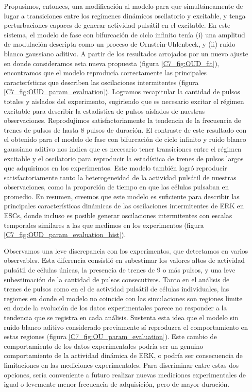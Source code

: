 \documentclass[./main.tex]{subfiles}
\begin{document}
Propusimos, entonces, una modificación al modelo para que simultáneamente de lugar a transiciones entre los regímenes dinámicos oscilatorio y excitable, y tenga perturbaciones capaces de generar actividad pulsátil en el excitable. En este sistema, el modelo de fase con bifurcación de ciclo infinito tenía (i) una amplitud de modulación descripta como un proceso de Ornstein-Uhlenbeck, y (ii) ruido blanco gaussiano aditivo.  A partir de los resultados arrojados por un nuevo ajuste en donde consideramos esta nueva propuesta (figura \ref{C7_fig:OUD_fit}), encontramos que el modelo reproducía correctamente las principales características que describen las oscilaciones intermitentes (figura \ref{C7_fig:OUD_param_evaluation}). Logramos recapitular la cantidad de pulsos totales y aislados del experimento, sugiriendo que es necesario excitar el régimen excitable para describir la estadística de pulsos aislados de nuestras observaciones. Reprodujimos satisfactoriamente la tendencia de la frecuencia de trenes de pulsos de hasta 8 pulsos de duración. El contraste de este resultado con el obtenido para el modelo de fase con bifurcación de ciclo infinito y ruido blanco gaussiano aditivo nos indica que es necesario tener transiciones entre el régimen excitable y el oscilatorio para reproducir la estadística de trenes de pulsos largos que adquirimos en los experimentos. Este modelo también logró reproducir satisfactoriamente tanto la heterogeneidad de la actividad pulsátil de nuestras observaciones, como la proporción de tiempo en que las células pulsaban en promedio. En resumen, creemos que este modelo es suficiente para describir las principales características dinámicas de las oscilaciones intermitentes de ERK en ESCs, donde incluso es posible generar oscilaciones intermitentes con escalas temporales similares a las que medimos en los experimentos (figura \ref{C7_fig:OUD_param_evaluation_hist}). 


Observamos una leve discrepancia con los experimentos, que detectamos en varios observables. Esta diferencia consistió en subestimar los valores altos de actividad pulsátil de células únicas, la presencia de trenes de 9 o más pulsos, y una leve subestimación de la cantidad de pulsos consecutivos. Tanto en el análisis de trenes de pulsos como en el de actividad pulsátil de células individuales, las regiones en donde el modelo no coincide con las simulaciones son regiones límite en donde la evolución de los datos experimentales parece no responder a la tendencia que se registra en cada análisis. Sustenta esta idea que el modelo sin ruido blanco aditivo considerado previamente sí reproduzca el comportamiento en estas regiones (figura \ref{C7_fig:OU_param_evaluation}). Este cambio de comportamiento de los datos experimentales podría ser un genuino comportamiento de la actividad dinámica de ERK, o podría ser consecuencia de limitaciones en las mediciones experimentales. Para discriminar entre estas dos opciones, sería conveniente a futuro realizar nuevas mediciones experimentales de igual o levemente menor frecuencia de adquisición, pero de mayor duración. 
\end{document}
